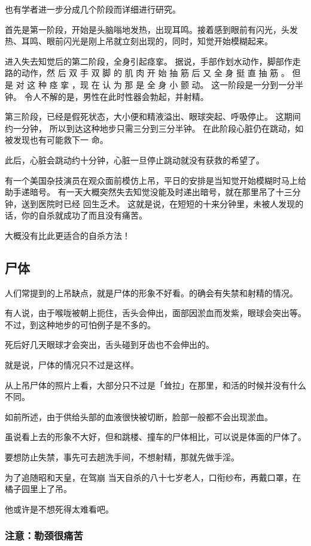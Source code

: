 \documentclass[UTF8]{ctexart}
\begin{document}
也有学者进一步分成几个阶段而详细进行研究。

首先是第一阶段，开始是头脑嗡地发热，出现耳鸣。接着感到眼前有闪光，头发热、耳鸣、眼前闪光是刚上吊就立刻出现的，同时，知觉开始模糊起来。

进入失去知觉后的第二阶段，全身引起痉挛。
据说，手部作划水动作，脚部作走路的动作，然 后 双 手 双 脚 的 肌 肉 开 始 抽 筋 后 又 全 身 挺 直 抽 筋 。
但是 对 这 种 痉 挛 ，现 在 认 为 那 是 全 身 小 颤 动。
这一阶段是一分到一分半钟。
令人不解的是，男性在此时性器会勃起，并射精。

 第三阶段，已经是假死状态，大小便和精液溢出、眼球突起、呼吸停止。
这期间约一分钟， 所以到达这种地步只需三分到三分半钟。
在此阶段心脏仍在跳动，如被发现也有可能救下一 命。

此后，心脏会跳动约十分钟，心脏一旦停止跳动就没有获救的希望了。

有一个美国杂技演员在观众面前模仿上吊，平日的安排是当知觉开始模糊时马上给助手递暗号。
有一天大概突然失去知觉没能及时递出暗号，就在那里吊了十三分钟，送到医院时已经 回生乏术。
这就是说，在短短的十来分钟里，未被人发现的话，你的自杀就成功了而且没有痛苦。

大概没有比此更适合的自杀方法！

\subsection{尸体}
 
人们常提到的上吊缺点，就是尸体的形象不好看。的确会有失禁和射精的情况。

有人说，由于喉咙被朝上扼住，舌头会伸出，面部因淤血而发紫，眼球会突出等。不过，到这种地步的可怕例子是不多的。

死后好几天眼球才会突出，舌头碰到牙齿也不会伸出的。

就是说，尸体的情况只不过是这样。

从上吊尸体的照片上看，大部分只不过是「耸拉」在那里，和活的时候并没有什么不同。

如前所述，由于供给头部的血液很快被切断，脸部一般都不会出现淤血。

虽说看上去的形象不大好，但和跳楼、撞车的尸体相比，可以说是体面的尸体了。

要想防止失禁，事先可去趟洗手间，不想射精，那就先做手淫。

为了追随昭和天皇，在驾崩 当天自杀的八十七岁老人，口衔纱布，再戴口罩，在橘子园里上了吊。

他或许是不想死得太难看吧。

\subsubsection*{注意：勒颈很痛苦}
\end{document}
